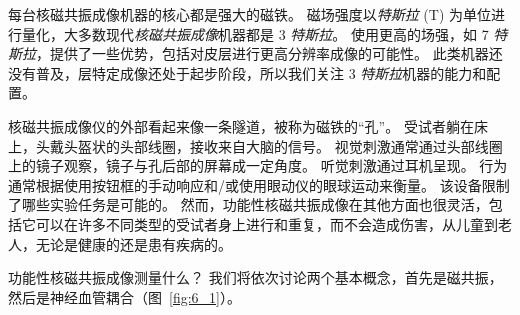 每台核磁共振成像机器的核心都是强大的磁铁。 
磁场强度以\textit{特斯拉} (T) 为单位进行量化，大多数现代\textit{核磁共振成像}机器都是 3 \textit{特斯拉}。 
使用更高的场强，如 7 \textit{特斯拉}，提供了一些优势，包括对皮层进行更高分辨率成像的可能性。
此类机器还没有普及，层特定成像还处于起步阶段，所以我们关注 3 \textit{特斯拉}机器的能力和配置。


核磁共振成像仪的外部看起来像一条隧道，被称为磁铁的“孔”。
受试者躺在床上，头戴头盔状的头部线圈，接收来自大脑的信号。
视觉刺激通常通过头部线圈上的镜子观察，镜子与孔后部的屏幕成一定角度。
听觉刺激通过耳机呈现。
行为通常根据使用按钮框的手动响应和/或使用眼动仪的眼球运动来衡量。
该设备限制了哪些实验任务是可能的。
然而，功能性核磁共振成像在其他方面也很灵活，包括它可以在许多不同类型的受试者身上进行和重复，而不会造成伤害，从儿童到老人，无论是健康的还是患有疾病的。


功能性核磁共振成像测量什么？
我们将依次讨论两个基本概念，首先是磁共振，然后是神经血管耦合（图~\ref{fig:6_1}）。


